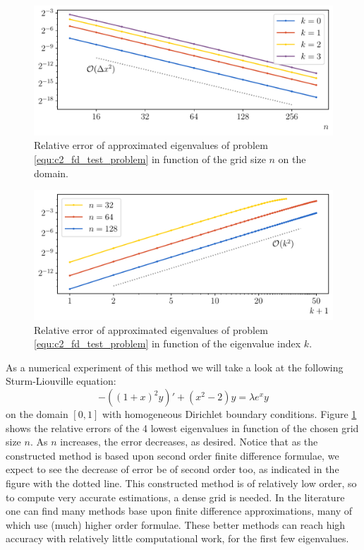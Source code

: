 \begin{figure}
    \begin{center}
        \includegraphics[width=\textwidth]{img/chapter2/finite_difference_h_error.pdf}
    \end{center}
    \caption{Relative error of approximated eigenvalues of problem \eqref{equ:c2_fd_test_problem} in function of the grid size $n$ on the domain.}
    \label{fig:c2_fd_h_error}
\end{figure}

\begin{figure}
    \begin{center}
        \includegraphics[width=\textwidth]{img/chapter2/finite_difference_k_error.pdf}
    \end{center}
    \caption{Relative error of approximated eigenvalues of problem \eqref{equ:c2_fd_test_problem} in function of the eigenvalue index $k$.}
    \label{fig:c2_fd_k_error}
\end{figure}

As a numerical experiment of this method we will take a look at the following Sturm-Liouville equation:
\begin{equation}\label{equ:c2_fd_test_problem}
    -\left((1+x)^2 y \right)' + (x^2 - 2) y = \lambda e^x y
\end{equation}
on the domain $[0, 1]$ with homogeneous Dirichlet boundary conditions. Figure \ref{fig:c2_fd_h_error} shows the relative errors of the 4 lowest eigenvalues in function of the chosen grid size $n$. As $n$ increases, the error decreases, as desired. Notice that as the constructed method is based upon second order finite difference formulae, we expect to see the decrease of error be of second order too, as indicated in the figure with the dotted line. This constructed method is of relatively low order, so to compute very accurate estimations, a dense grid is needed. In the literature one can find many methods base upon finite difference approximations, many of which use (much) higher order formulae. These better methods can reach high accuracy with relatively little computational work, for the first few eigenvalues.

